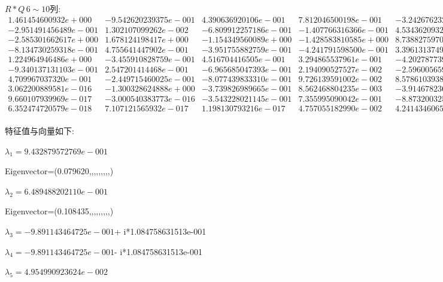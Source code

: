 \begin{landscape}
$R\ast Q\,6\sim 10$列:
\[
\begin{matrix}
1.461454600932e+000 & -9.542620239375e-001 & 4.390636920106e-001 & 7.812046500198e-001 & -3.242676232229e-001\\-2.951491456489e-001 & 1.302107099262e-002 & -6.809912257186e-001 & -1.407766316366e-001 & 4.534362093239e-003\\-2.585301662617e+000 & 1.678124198417e+000 & -1.154349560089e+000 & -1.428583810585e+000 & 8.738827597003e-001\\-8.134730259318e-001 & 4.755641447902e-001 & -3.951755882759e-001 & -4.241791598500e-001 & 3.396131374910e-001\\1.224964946486e+000 & -3.455910828759e-001 & 4.516704416505e-001 & 3.294865537961e-001 & -4.202787739855e-002\\-9.340137131103e-001 & 2.547201414468e-001 & -6.965685047393e-001 & 2.194090527527e-002 & -2.596005659042e-001\\4.709967037320e-001 & -2.449715460025e-001 & -8.077439833310e-001 & 9.726139591002e-002 & 8.578610393813e-002\\3.062200889581e-016 & -1.300328624888e+000 & -3.739826989665e-001 & 8.562468804235e-003 & -3.914678236392e-001\\9.660107939969e-017 & -3.000540383773e-016 & -3.543228021145e-001 & 7.355995090042e-001 & -8.873200325455e-002\\6.352474720579e-018 & 7.107121565932e-017 & 1.198130793216e-017 & 4.757055182990e-002 & 4.241434606534e-002\\
\end{matrix}\]



\newpage
特征值与向量如下:

$\lambda_{1}= 9.432879572769e-001$ 

Eigenvector=(0.079620,,,,,,,,,)


\vbox{}
$\lambda_{2}= 6.489488202110e-001$ 

Eigenvector=(0.108435,,,,,,,,,)


\vbox{}
$\lambda_{3}= -9.891143464725e-001$+ i*1.084758631513e-001


\vbox{}
$\lambda_{4}= -9.891143464725e-001$- i*1.084758631513e-001


\vbox{}
$\lambda_{5}= 4.954990923624e-002$ 


\end{landscape}
